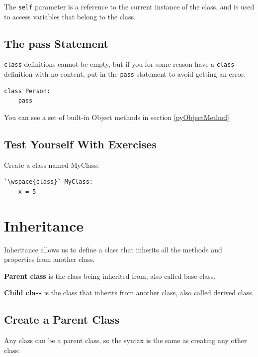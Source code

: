 \documentclass[12pt,a4paper]{article}
\newcommand{\wspace}[1]{%
	\color{white}\colorbox{white}{\texttt{#1}}%
}
\newcommand{\code}[1]{%
	\colorbox{backcolour}{\lstinline{#1}}%
}
\newcommand{\lcode}[1]{%
	\lstinline{#1}%
}
\begin{document}
\begin{nbox}
The \lcode{self} parameter is a reference to the current instance of the class,
and is used to access variables that belong to the class.
\end{nbox}
\subsection{The pass Statement}

\code{class} definitions cannot be empty, but if you for some reason have a
\code{class} definition with no content, put in the \code{pass} statement to
avoid getting an error.

\begin{ebox}
	\begin{lstlisting}
class Person:
    pass
	\end{lstlisting}
\end{ebox}
You can see a set of built-in Object methods in section \ref{pyObjectMethod}
\subsection{Test Yourself With Exercises}

\begin{tbox}
Create a class named MyClass:
	\begin{lstlisting}
`\wspace{class}` MyClass:
    x = 5
	\end{lstlisting}
\end{tbox}
\vfill\newpage
\section{Inheritance}

Inheritance allows us to define a class that inherits all the methods and
properties from another class.

\textbf{Parent class} is the class being inherited from, also called base class.

\textbf{Child class} is the class that inherits from another class, also called
derived class.

\subsection{Create a Parent Class}

Any class can be a parent class, so the syntax is the same as creating any other class:
\end{document}
